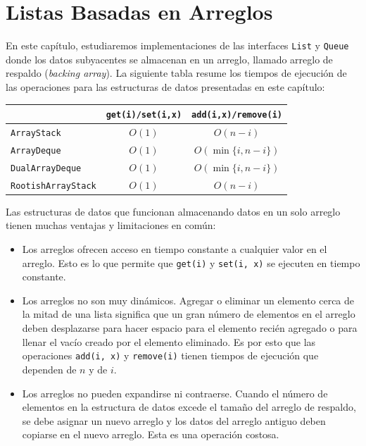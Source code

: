 \documentclass[11pt]{book}
\theoremstyle{plain}
\begin{document}
\setcounter{chapter}{1}
\chapter{Listas Basadas en Arreglos}
\label{ch:listas-arreglos}

En este capítulo, estudiaremos implementaciones de las interfaces \texttt{List} y \texttt{Queue} donde los datos subyacentes se almacenan en un arreglo, llamado arreglo de respaldo (\emph{backing array}). La siguiente tabla resume los tiempos de ejecución de las operaciones para las estructuras de datos presentadas en este capítulo:

\begin{center}
\begin{tabular}{lcc}
\hline
 & \texttt{get(i)/set(i,x)} & \texttt{add(i,x)/remove(i)} \\
\hline
\texttt{ArrayStack} & $O(1)$ & $O(n-i)$ \\
\texttt{ArrayDeque} & $O(1)$ & $O(\min\{i, n-i\})$ \\
\texttt{DualArrayDeque} & $O(1)$ & $O(\min\{i, n-i\})$ \\
\texttt{RootishArrayStack} & $O(1)$ & $O(n-i)$ \\
\hline
\end{tabular}
\end{center}

Las estructuras de datos que funcionan almacenando datos en un solo arreglo tienen muchas ventajas y limitaciones en común:

\begin{itemize}
    \item Los arreglos ofrecen acceso en tiempo constante a cualquier valor en el arreglo. Esto es lo que permite que \texttt{get(i)} y \texttt{set(i, x)} se ejecuten en tiempo constante.

    \item Los arreglos no son muy dinámicos. Agregar o eliminar un elemento cerca de la mitad de una lista significa que un gran número de elementos en el arreglo deben desplazarse para hacer espacio para el elemento recién agregado o para llenar el vacío creado por el elemento eliminado. Es por esto que las operaciones \texttt{add(i, x)} y \texttt{remove(i)} tienen tiempos de ejecución que dependen de $n$ y de $i$.

    \item Los arreglos no pueden expandirse ni contraerse. Cuando el número de elementos en la estructura de datos excede el tamaño del arreglo de respaldo, se debe asignar un nuevo arreglo y los datos del arreglo antiguo deben copiarse en el nuevo arreglo. Esta es una operación costosa.
\end{itemize}
\end{document}
